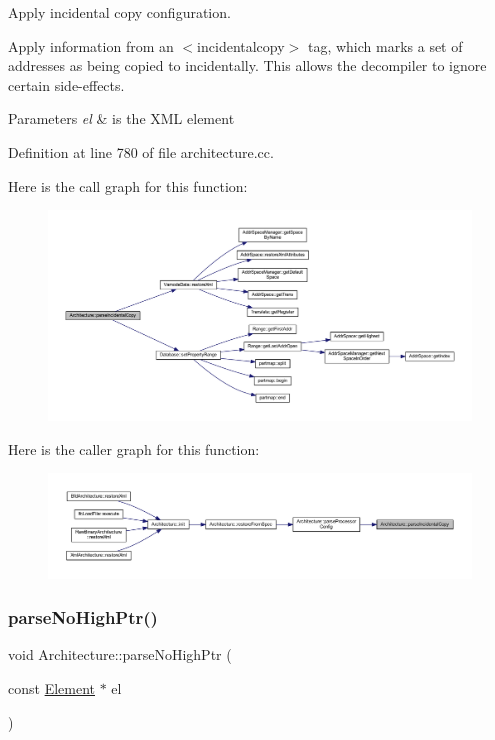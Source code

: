Apply incidental copy configuration. 

Apply information from an $<$incidentalcopy$>$ tag, which marks a set of addresses as being copied to incidentally. This allows the decompiler to ignore certain side-\/effects. 
\begin{DoxyParams}{Parameters}
{\em el} & is the X\+ML element \\
\hline
\end{DoxyParams}


Definition at line 780 of file architecture.\+cc.

Here is the call graph for this function\+:
\nopagebreak
\begin{figure}[H]
\begin{center}
\leavevmode
\includegraphics[width=350pt]{class_architecture_a8b2290f8d9cf479d4b49fb26c83ff8c5_cgraph}
\end{center}
\end{figure}
Here is the caller graph for this function\+:
\nopagebreak
\begin{figure}[H]
\begin{center}
\leavevmode
\includegraphics[width=350pt]{class_architecture_a8b2290f8d9cf479d4b49fb26c83ff8c5_icgraph}
\end{center}
\end{figure}
\mbox{\label{class_architecture_a6f51fadb288b36927fa9dfda725ffd88}} 
\subsubsection{\texorpdfstring{parseNoHighPtr()}{parseNoHighPtr()}}
{\footnotesize\ttfamily void Architecture\+::parse\+No\+High\+Ptr (\begin{DoxyParamCaption}\item[{const \mbox{\hyperlink{class_element}{Element}} $\ast$}]{el }\end{DoxyParamCaption})\hspace{0.3cm}{\ttfamily [protected]}}




